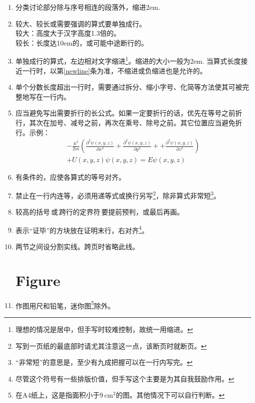 \documentclass[11pt, a4paper, titlepage]{article}
\begin{document}
\begin{enumerate}
\item 分类讨论部分除与序号相连的段落外，缩进2em.

\item 较大、较长或需要强调的算式要单独成行。\\
    较大：高度大于汉字高度1.3倍的。\\
    较长：长度达10em的，或可能中途断行的。\\

\item 单独成行的算式，左边相对文字缩进\footnote{理想的情况是居中，但手写时较难控制，故统一用缩进。}。缩进的大小一般为2em. 当算式长度接近一行时，以第\ref{newline}条为准，不缩进或负缩进也是允许的。

\item 单个分数长度超出一行时，需要通过拆分、缩小字号、化简等方法使其可被完整地写在一行内。

\item \label{newline}应当避免写出需要折行的长公式。如果一定要折行的话，优先在等号之前折行，其次在加号、减号之前，再次在乘号、除号之前。其它位置应当避免折行。示例：
    \begin{multline*}
        -\frac{{\hbar}^{2}}{2m} \left( \frac{{\partial}^{2}\psi(x,y,z)}{\partial x^{2}} + \frac{{\partial}^{2}\psi(x,y,z)}{\partial y^{2}}+ + \frac{{\partial}^{2}\psi(x,y,z)}{\partial z^{2}} \right) \\
        + U(x,y,z)\psi(x,y,z) = E\psi(x,y,z)
    \end{multline*}

\item 有条件的，应使各算式的等号对齐。

\item 禁止在一行内连等，必须用递等式或换行另写\footnote{写到一页纸的最底部时请尤其注意这一点，该断页时就断页。}，除非算式非常短\footnote{“非常短”的意思是，至少有九成把握可以在一行内写完。}。

\item 较高的括号\,或\,跨行的定界符\,要提前预判，或最后再画。

\item 表示“证毕”的方块放在证明末行，右对齐\footnote{尽管这个符号有一些排版价值，但手写这个主要是为其自我鼓励作用。}。

\item 两节之间设分割实线。跨页时省略此线。





\part{Figure}
\item 作图用尺和铅笔，迷你图\footnote{在A4纸上，这是指面积小于$9\,\mathrm{cm}^{2}$的图。其他情况下可以自行判断。}除外。


\end{enumerate}
\end{document}
